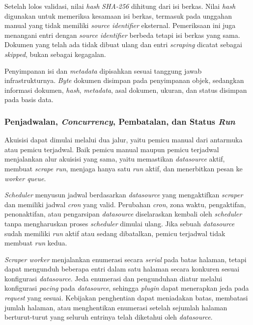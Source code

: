 Setelah lolos validasi, nilai \textit{hash} \textit{SHA-256} dihitung dari isi berkas.
Nilai \textit{hash} digunakan untuk memeriksa kesamaan isi berkas, termasuk pada unggahan manual yang tidak memiliki \textit{source identifier} eksternal.
Pemeriksaan ini juga menangani entri dengan \textit{source identifier} berbeda tetapi isi berkas yang sama.
Dokumen yang telah ada tidak dibuat ulang dan entri \textit{scraping} dicatat sebagai \textit{skipped}, bukan sebagai kegagalan.

Penyimpanan isi dan \textit{metadata} dipisahkan sesuai tanggung jawab infrastrukturnya.
\textit{Byte} dokumen disimpan pada penyimpanan objek, sedangkan informasi dokumen, \textit{hash}, \textit{metadata}, asal dokumen, ukuran, dan status disimpan pada basis data.

\subsubsection{Penjadwalan, \textit{Concurrency}, Pembatalan, dan Status \textit{Run}}
\label{sec:solusi-pengendalian-run}

Akuisisi dapat dimulai melalui dua jalur, yaitu pemicu manual dari antarmuka atau pemicu terjadwal.
Baik pemicu manual maupun pemicu terjadwal menjalankan alur akuisisi yang sama, yaitu memastikan \textit{datasource} aktif, membuat \textit{scrape run}, menjaga hanya satu \textit{run} aktif, dan menerbitkan pesan ke \textit{worker queue}.

\textit{Scheduler} menyusun jadwal berdasarkan \textit{datasource} yang mengaktifkan \textit{scraper} dan memiliki jadwal \textit{cron} yang valid.
Perubahan \textit{cron}, zona waktu, pengaktifan, penonaktifan, atau pengarsipan \textit{datasource} diselaraskan kembali oleh \textit{scheduler} tanpa mengharuskan proses \textit{scheduler} dimulai ulang.
Jika sebuah \textit{datasource} sudah memiliki \textit{run} aktif atau sedang dibatalkan, pemicu terjadwal tidak membuat \textit{run} kedua.

\textit{Scraper worker} menjalankan enumerasi secara \textit{serial} pada batas halaman, tetapi dapat mengunduh beberapa entri dalam satu halaman secara konkuren sesuai konfigurasi \textit{datasource}.
Jeda enumerasi dan pengunduhan diatur melalui konfigurasi \textit{pacing} pada \textit{datasource}, sehingga \textit{plugin} dapat menerapkan jeda pada \textit{request} yang sesuai.
Kebijakan penghentian dapat meniadakan batas, membatasi jumlah halaman, atau menghentikan enumerasi setelah sejumlah halaman berturut-turut yang seluruh entrinya telah diketahui oleh \textit{datasource}.


